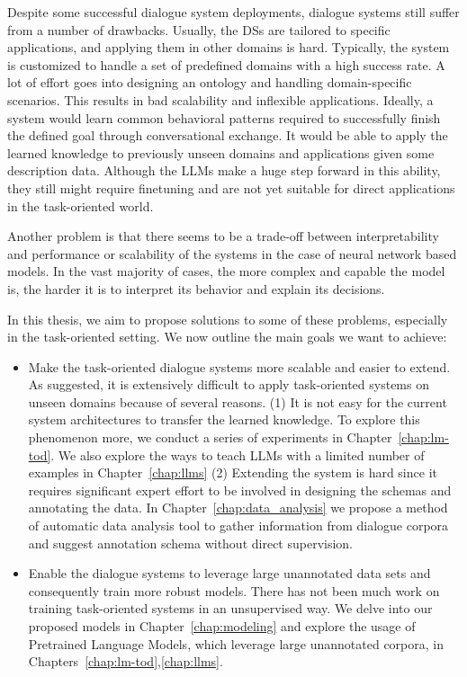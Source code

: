 Despite some successful dialogue system deployments, dialogue systems still suffer from a number of drawbacks.
Usually, the DSs are tailored to specific applications, and applying them in other domains is hard.
Typically, the system is customized to handle a set of predefined domains with a high success rate.
A lot of effort goes into designing an ontology and handling domain-specific scenarios.
This results in bad scalability and inflexible applications.
Ideally, a system would learn common behavioral patterns required to successfully finish the defined goal through conversational exchange.
It would be able to apply the learned knowledge to previously unseen domains and applications given some description data.
Although the LLMs make a huge step forward in this ability, they still might require finetuning and are not yet suitable for direct applications in the task-oriented world.

Another problem is that there seems to be a trade-off between interpretability and performance or scalability of the systems in the case of neural network based models.
In the vast majority of cases, the more complex and capable the model is, the harder it is to interpret its behavior and explain its decisions.

In this thesis, we aim to propose solutions to some of these problems, especially in the task-oriented setting.
We now outline the main goals we want to achieve:
\begin{itemize}
    \item Make the task-oriented dialogue systems more scalable and easier to extend. As suggested, it is extensively difficult to apply task-oriented systems on unseen domains because of several reasons. (1) It is not easy for the current system architectures to transfer the learned knowledge. To explore this phenomenon more, we conduct a series of experiments in Chapter~\ref{chap:lm-tod}. We also explore the ways to teach LLMs with a limited number of examples in Chapter~\ref{chap:llms} (2) Extending the system is hard since it requires significant expert effort to be involved in designing the schemas and annotating the data. In Chapter~\ref{chap:data_analysis} we propose a method of automatic data analysis tool to gather information from dialogue corpora and suggest annotation schema without direct supervision.
    \item Enable the dialogue systems to leverage large unannotated data sets and consequently train more robust models. There has not been much work on training task-oriented systems in an unsupervised way. We delve into our proposed models in Chapter~\ref{chap:modeling} and explore the usage of Pretrained Language Models, which leverage large unannotated corpora, in Chapters~\ref{chap:lm-tod},\ref{chap:llms}.
\end{itemize}

